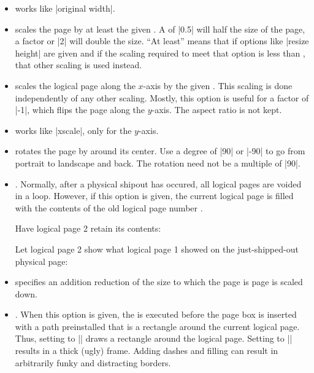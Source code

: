 \begin{command}{\pgfpageslogicalpageoptions{}}
\begin{itemize}
    You need this option only for special logical pages that have
    a height or width different from the normal one and for which you
    will (later on) set these sizes yourself.
  \item
    works like |original width|.
  \item
    scales the page by at least the given . A
     of |0.5| will half the size of the page, a factor or
    |2| will double the size. ``At least'' means that if options like
    |resize height| are given and if the scaling required to meet that
    option is less than , that other scaling is used
    instead. 
  \item
    scales the logical page along the $x$-axis by the given
    . This scaling is done independently of any other
    scaling. Mostly, this option is useful for a factor of |-1|, which
    flips the page along the $y$-axis. The aspect ratio is not kept.
  \item
    works like |xscale|, only for the $y$-axis.
  \item
    rotates the page by  around its center. Use a degree
    of |90| or |-90| to go from portrait to landscape and back. The
    rotation need not be a multiple of |90|.
  \item
    .
    Normally, after a physical shipout has occured, all logical pages
    are voided in a loop. However, if this option is given, the
    current logical page is filled with the contents of the old
    logical page number .

    \example Have logical page 2 retain its contents:
\begin{codeexample}
\end{codeexample}

    \example Let logical page 2 show what logical page 1 showed on the
    just-shipped-out physical page:
\begin{codeexample}
\end{codeexample}
  \item
    specifies an addition reduction of the size to which the page is
    page is scaled down.
  \item
    .
    When this option is given, the  is executed before the
    page box is inserted with a path preinstalled that is a rectangle
    around the current logical page. Thus, setting  to
    |\pgfstroke| draws a rectangle around the logical page. Setting
     to |\pgfsetlinewidth{3pt}\pgfstroke| results in a
    thick (ugly) frame. Adding dashes and filling can result in
    arbitrarily funky and distracting borders.


\end{itemize}
\end{command}
